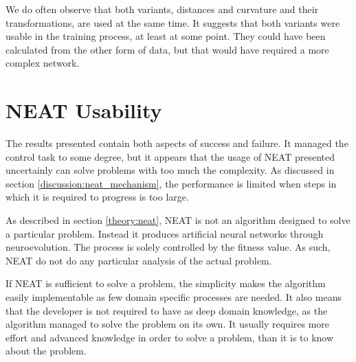 We do often observe that both variants, distances and curvature and their transformations, are used at the same time. It suggests that both variants were usable in the training process, at least at some point. They could have been calculated from the other form of data, but that would have required a more complex network.

\section{NEAT Usability}

The results presented contain both aspects of success and failure. It managed the control task to some degree, but it appears that the usage of NEAT presented uncertainly can solve problems with too much the complexity. As discussed in section \ref{discussion:neat_mechanism}, the performance is limited when steps in which it is required to progress is too large.

As described in section \ref{theory:neat}, NEAT is not an algorithm designed to solve a particular problem. Instead it produces artificial neural networks through neuroevolution. The process is solely controlled by the fitness value. As such, NEAT do not do any particular analysis of the actual problem. 

If NEAT is sufficient to solve a problem, the simplicity makes the algorithm easily implementable as few domain specific processes are needed. It also means that the developer is not required to have as deep domain knowledge, as the algorithm managed to solve the problem on its own. It usually requires more effort and advanced knowledge in order to solve a problem, than it is to know about the problem.




